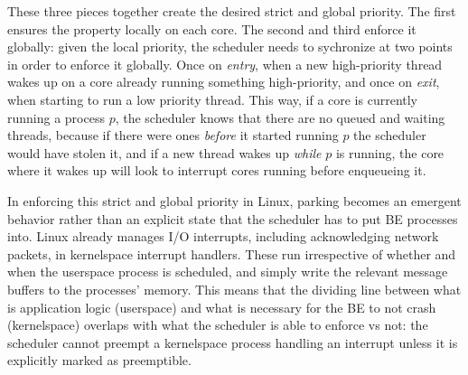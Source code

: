 These three pieces together create the desired strict and global priority. The
first ensures the property locally on each core. The second and third enforce it
globally: given the local priority, the scheduler needs to sychronize at two
points in order to enforce it globally. Once on \textit{entry}, when a new
high-priority thread wakes up on a core already running something high-priority,
and once on \textit{exit}, when starting to run a low priority thread. This way,
if a core is currently running a \beclass{} process $p$, the scheduler knows
that there are no queued and waiting \normalclass{} threads, because if there
were ones \textit{before} it started running $p$ the scheduler would have stolen
it, and if a new \normalclass{} thread wakes up \textit{while} $p$ is running,
the core where it wakes up will look to interrupt cores running \beclass{}
before enqueueing it.

In enforcing this strict and global priority in Linux, parking becomes an
emergent behavior rather than an explicit state that the scheduler has to put BE
processes into. Linux already manages I/O interrupts, including acknowledging
network packets, in kernelspace interrupt handlers. These run irrespective of
whether and when the userspace process is scheduled, and simply write the
relevant message buffers to the processes' memory. This means that the dividing
line between what is application logic (userspace) and what is necessary for the
BE to not crash (kernelspace) overlaps with what the scheduler is able to
enforce vs not: the scheduler cannot preempt a kernelspace process handling an
interrupt unless it is explicitly marked as preemptible.
